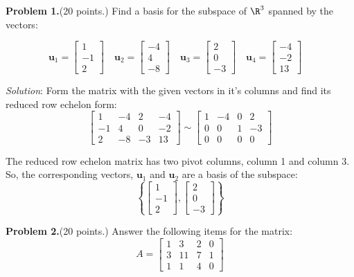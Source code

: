 \documentclass[12pt]{article}
\begin{document}
\textbf{Problem 1.}(20 points.) 
Find a basis for the subspace of $\R^3$ spanned by the vectors:

$$
\mathbf{u}_1=\left[\begin{matrix}1\\-1\\2\end{matrix}\right]\quad
\mathbf{u}_2=\left[\begin{matrix}-4\\4\\-8\end{matrix}\right]\quad
\mathbf{u}_3=\left[\begin{matrix}2\\0\\-3\end{matrix}\right]\quad
\mathbf{u}_4=\left[\begin{matrix}-4\\-2\\13\end{matrix}\right]\quad
$$

\emph{Solution}: Form the matrix with the given vectors in it's columns and find its reduced row echelon form:
\[
\left[\begin{matrix}1 & -4 & 2 & -4\\-1 & 4 & 0 & -2\\2 & -8 & -3 & 13\end{matrix}\right]\sim
\left[\begin{matrix}1 & -4 & 0 & 2\\0 & 0 & 1 & -3\\0 & 0 & 0 & 0\end{matrix}\right]
\]

The reduced row echelon matrix has two pivot columns, column 1 and column 3. So, the corresponding vectors, $\mathbf{u}_1$ and $\mathbf{u}_2$ are a basis of the subspace:
\[
\left\{
\left[\begin{matrix}1\\-1\\2\end{matrix}\right],
\left[\begin{matrix}2\\0\\-3\end{matrix}\right]
\right\}
\]
\proofend


\textbf{Problem 2.}(20 points.)
Answer the following items for the matrix:
\[
A=
\begin{bmatrix}1&3&2&0\\3&11&7&1\\1&1&4&0\end{bmatrix}
\] 
\end{document}
